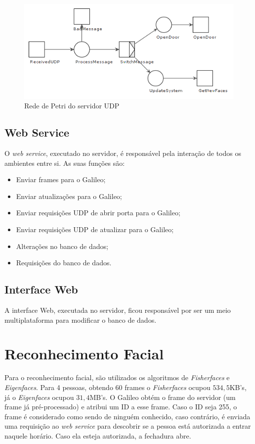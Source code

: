\documentclass[12pt]{article}
\begin{document}
    \begin{figure}[ht]
		\centering
		\includegraphics[width=.7\textwidth]{petri-udp}
		\caption{Rede de Petri do servidor UDP}
		\label{fig:petri-udp}
	\end{figure}

\subsection{Web Service}
    O \textit{web service}, executado no servidor, é responsável pela interação
    de todos os ambientes entre si. As suas funções são:
    \begin{itemize}
        \item Enviar frames para o Galileo;
        \item Enviar atualizações para o Galileo;
        \item Enviar requisições UDP de abrir porta para o Galileo;
        \item Enviar requisições UDP de atualizar para o Galileo;
        \item Alterações no banco de dados;
        \item Requisições do banco de dados.
    \end{itemize}

\subsection{Interface Web}
    A interface Web, executada no servidor, ficou responsável por ser um meio
    multiplataforma para modificar o banco de dados.

\section{Reconhecimento Facial}
    Para o reconhecimento facial, são utilizados os algoritmos de	\textit{Fisherfaces} e \textit{Eigenfaces}. Para 4 pessoas, obtendo 60 frames
    o \textit{Fisherfaces} ocupou $534,5$KB's, já o \textit{Eigenfaces} ocupou
    $31,4$MB's.
    O Galileo obtém o frame do servidor (um frame já pré-processado) e atribui
    um ID a esse frame. Caso o ID seja 255, o frame é considerado como sendo de
    ninguém conhecido, caso contrário, é enviada uma requisição ao
    \textit{web service} para descobrir se a pessoa está autorizada a entrar
    naquele horário. Caso ela esteja autorizada, a fechadura abre.
\end{document}
